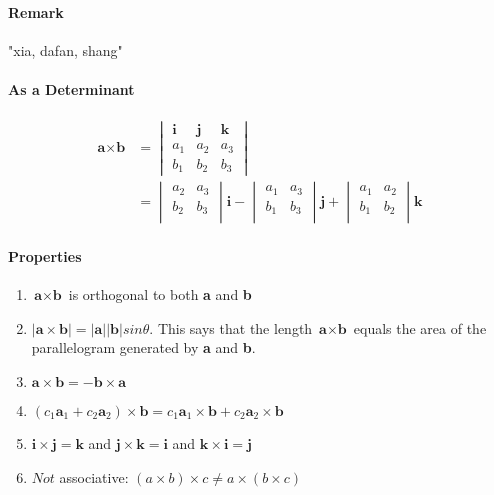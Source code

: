 \documentclass[11pt]{article}
\newcommand{\tb}[1]{\textbf{#1}}
\newcommand{\va}[0]{\tb{a}}
\newcommand{\vb}[0]{\tb{b}}
\newcommand{\vi}[0]{\tb{i}}
\newcommand{\vj}[0]{\tb{j}}
\newcommand{\vk}[0]{\tb{k}}
\begin{document}
\paragraph{Remark} "xia, dafan, shang"
\paragraph{As a Determinant}
\begin{align*}
	\va \times \vb &= \begin{vmatrix}
		\vi & \vj & \vk \\
		a_1 & a_2 & a_3 \\
		b_1 & b_2 & b_3
	\end{vmatrix} \\
	&= \begin{vmatrix}
		a_2 & a_3 \\
		b_2 & b_3 \\
	\end{vmatrix} \vi - \begin{vmatrix}
		a_1 & a_3 \\
		b_1 & b_3 \\
	\end{vmatrix} \vj +  \begin{vmatrix}
		a_1 & a_2 \\
		b_1 & b_2 \\
	\end{vmatrix} \vk
\end{align*}
\paragraph{Properties}
\begin{enumerate}
	\item $\tb{a} \times \tb{b}$ is orthogonal to both \tb{a} and \tb{b}
	\item $|\tb{a} \times \tb{b}| = |\tb{a}||\tb{b}|sin\theta$. This says that the length $\tb{a} \times \tb{b}$ equals the area of the parallelogram generated by \tb{a} and \tb{b}.
	\item $\tb{a} \times \tb{b} = -\tb{b} \times \tb{a}$
	\item $(c_1\tb{a}_1 + c_2\tb{a}_2) \times \tb{b} = c_1\tb{a}_1 \times \tb{b} + c_2\tb{a}_2 \times \tb{b}$
	\item $\tb{i} \times \tb{j} = \tb{k}$ and $\tb{j} \times \tb{k} = \tb{i}$ and $\tb{k} \times \tb{i} = \tb{j}$
	\item $Not$ associative: $(a \times b) \times c \neq a \times (b \times c)$
\end{enumerate} 
\end{document}
